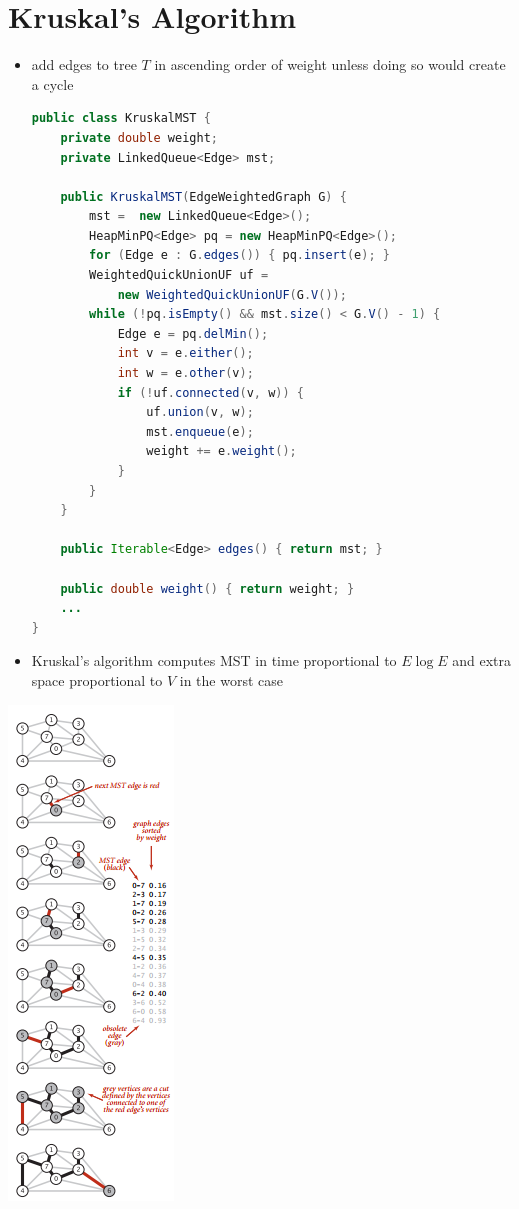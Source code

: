 \documentclass[8pt,a4paper,compress]{beamer}
\begin{document}
\section{Kruskal's Algorithm}
\begin{frame}[fragile]
\begin{minipage}{240pt}
\begin{itemize}
\item add edges to tree $T$ in ascending order of weight unless doing so would create a cycle
\begin{lstlisting}[language=Java]
public class KruskalMST {
    private double weight;  
    private LinkedQueue<Edge> mst;
    
    public KruskalMST(EdgeWeightedGraph G) {
        mst =  new LinkedQueue<Edge>();  
        HeapMinPQ<Edge> pq = new HeapMinPQ<Edge>();
        for (Edge e : G.edges()) { pq.insert(e); }
        WeightedQuickUnionUF uf = 
            new WeightedQuickUnionUF(G.V());
        while (!pq.isEmpty() && mst.size() < G.V() - 1) {
            Edge e = pq.delMin();
            int v = e.either();
            int w = e.other(v);
            if (!uf.connected(v, w)) { 
                uf.union(v, w); 
                mst.enqueue(e); 
                weight += e.weight();
            }
        }
    }

    public Iterable<Edge> edges() { return mst; }

    public double weight() { return weight; }
    ...
}
\end{lstlisting}

\item Kruskal's algorithm computes MST in time proportional to
$E \log E$ and extra space proportional to $V$ in the worst case
\end{itemize}
\end{minipage}%
\begin{minipage}{100pt}
\begin{center}
\includegraphics[scale=0.4]{./figures/mst4.png}


\end{center}
\end{minipage}
\end{frame}
\end{document}
